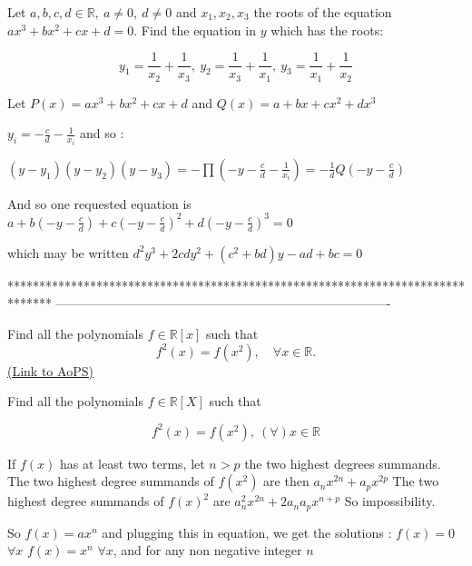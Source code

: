 \begin{solution}
	\begin{tcolorbox}Let $a,b,c,d\in \mathbb{R},\ a\neq 0,\ d\neq 0$ and $x_1,x_2,x_3$ the roots of the equation $ax^3+bx^2+cx+d=0$. Find the equation in $y$ which has the roots:

\[y_1=\frac{1}{x_2}+\frac{1}{x_3},\ y_2=\frac{1}{x_3}+\frac{1}{x_1},\ y_3=\frac{1}{x_1}+\frac{1}{x_2}\]\end{tcolorbox}
Let $P(x)=ax^3+bx^2+cx+d$ and $Q(x)=a+bx+cx^2+dx^3$

$y_i=-\frac cd-\frac 1{x_i}$ and so :

$(y-y_1)(y-y_2)(y-y_3)=-\prod(-y-\frac cd-\frac 1{x_i})=-\frac 1dQ(-y-\frac cd)$

And so one requested equation is $a+b(-y-\frac cd)+c(-y-\frac cd)^2+d(-y-\frac cd)^3=0$

which may be written $\boxed{d^2y^3+2cdy^2+(c^2+bd)y-ad+bc=0}$
\end{solution}
*******************************************************************************
-------------------------------------------------------------------------------

\begin{problem}
	Find all the polynomials $f\in \mathbb{R}[x]$ such that 
\[f^2(x)=f(x^2), \quad \forall x\in \mathbb{R}.\]
	\flushright \href{https://artofproblemsolving.com/community/c6h392413}{(Link to AoPS)}
\end{problem}



\begin{solution}
	\begin{tcolorbox}Find all the polynomials $f\in \mathbb{R}[X]$ such that 

\[f^2(x)=f(x^2),\ (\forall)x\in \mathbb{R}\]\end{tcolorbox}
If $f(x)$ has at least two terms, let $n>p$ the two highest degrees summands.
The two highest degree summands of $f(x^2)$ are then $a_nx^{2n}+a_px^{2p}$
The two highest degree summands of $f(x)^2$ are $a_n^2x^{2n}+2a_na_px^{n+p}$
So impossibility.

So $f(x)=ax^n$ and plugging this in equation, we get the solutions :
$f(x)=0$ $\forall x$
$f(x)=x^n$ $\forall x$, and for any non negative integer $n$
\end{solution}



